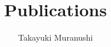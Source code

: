\documentclass{article}
\title{Publications}
\author{Takayuki Muranushi}
\begin{document}
\maketitle

\begin{bibunit}[custom2]
  \nocite{*}
  \renewcommand\refname{Peer-reviewed Publications}
  \putbib[books]
\end{bibunit}


\begin{bibunit}[custom2]
  \nocite{*}

  \renewcommand\refname{Peer-reviewed Publications}
  \putbib[publications]
\end{bibunit}
\end{document}
